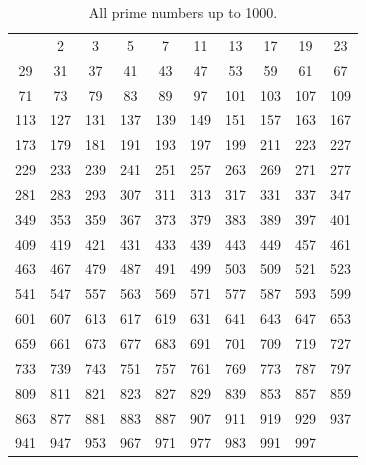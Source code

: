 \begin{table}[h!]
\vspace{-2mm}
\begin{center}
\caption[All prime numbers up to 1000.]{All prime numbers up to 1000.}
\begin{tabular}{| c | c | c | c | c | c | c | c | c | c |}
\hline
& 2 & 3 & 5 & 7 & 11 & 13 & 17 & 19 & 23 \\
29 & 31 & 37 & 41 & 43 & 47 & 53 & 59 & 61 & 67 \\
71 & 73 & 79 & 83 & 89 & 97 & 101 & 103 & 107 & 109 \\
113 & 127 & 131 & 137 & 139 & 149 & 151 & 157 & 163 & 167 \\
173 & 179 & 181 & 191 & 193 & 197 & 199 & 211 & 223 & 227 \\
229 & 233 & 239 & 241 & 251 & 257 & 263 & 269 & 271 & 277 \\
281 & 283 & 293 & 307 & 311 & 313 & 317 & 331 & 337 & 347 \\
349 & 353 & 359 & 367 & 373 & 379 & 383 & 389 & 397 & 401 \\
409 & 419 & 421 & 431 & 433 & 439 & 443 & 449 & 457 & 461 \\
463 & 467 & 479 & 487 & 491 & 499 & 503 & 509 & 521 & 523 \\
541 & 547 & 557 & 563 & 569 & 571 & 577 & 587 & 593 & 599 \\
601 & 607 & 613 & 617 & 619 & 631 & 641 & 643 & 647 & 653 \\
659 & 661 & 673 & 677 & 683 & 691 & 701 & 709 & 719 & 727 \\
733 & 739 & 743 & 751 & 757 & 761 & 769 & 773 & 787 & 797 \\
809 & 811 & 821 & 823 & 827 & 829 & 839 & 853 & 857 & 859 \\
863 & 877 & 881 & 883 & 887 & 907 & 911 & 919 & 929 & 937 \\
941 & 947 & 953 & 967 & 971 & 977 & 983 & 991 & 997 & \\
\hline
\end{tabular}
\end{center}
\vspace{-7mm}
\end{table}





